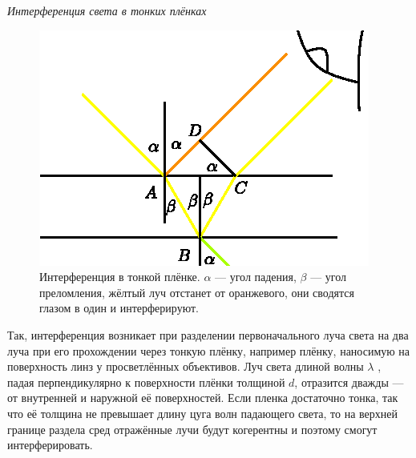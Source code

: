 \documentclass[__main__.tex]{subfiles}
\begin{document}
\textit{Интерференция света в тонких плёнках}\\
\begin{figure}[h]
	\includegraphics[width=1\linewidth]{img/o-03-1.eps}
	\caption{Интерференция в тонкой плёнке. $\alpha$ — угол падения, $\beta$ — угол преломления, жёлтый луч отстанет от оранжевого, они сводятся глазом в один и интерферируют.}
\end{figure}
Так, интерференция возникает при разделении первоначального луча света на два луча при его прохождении через тонкую плёнку, например плёнку, наносимую на поверхность линз у просветлённых объективов. Луч света длиной волны $\lambda$ , падая перпендикулярно к поверхности плёнки толщиной $d$, отразится дважды — от внутренней и наружной её поверхностей. Если пленка достаточно тонка, так что её толщина не превышает длину цуга волн падающего света, то на верхней границе раздела сред отражённые лучи будут когерентны и поэтому смогут интерферировать.
\end{document}

